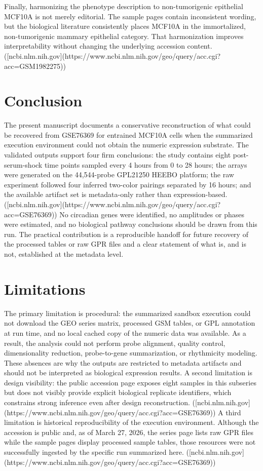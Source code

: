 \documentclass[11pt]{article}
\begin{document}
Finally, harmonizing the phenotype description to non-tumorigenic epithelial MCF10A is not merely editorial. The sample pages contain inconsistent wording, but the biological literature consistently places MCF10A in the immortalized, non-tumorigenic mammary epithelial category. That harmonization improves interpretability without changing the underlying accession content. ([ncbi.nlm.nih.gov](https://www.ncbi.nlm.nih.gov/geo/query/acc.cgi?acc=GSM1982275))

\section{Conclusion}
The present manuscript documents a conservative reconstruction of what could be recovered from GSE76369 for entrained MCF10A cells when the summarized execution environment could not obtain the numeric expression substrate. The validated outputs support four firm conclusions: the study contains eight post-serum-shock time points sampled every 4 hours from 0 to 28 hours; the arrays were generated on the 44,544-probe GPL21250 HEEBO platform; the raw experiment followed four inferred two-color pairings separated by 16 hours; and the available artifact set is metadata-only rather than expression-based. ([ncbi.nlm.nih.gov](https://www.ncbi.nlm.nih.gov/geo/query/acc.cgi?acc=GSE76369)) No circadian genes were identified, no amplitudes or phases were estimated, and no biological pathway conclusions should be drawn from this run. The practical contribution is a reproducible handoff for future recovery of the processed tables or raw GPR files and a clear statement of what is, and is not, established at the metadata level.

\section{Limitations}
The primary limitation is procedural: the summarized sandbox execution could not download the GEO series matrix, processed GSM tables, or GPL annotation at run time, and no local cached copy of the numeric data was available. As a result, the analysis could not perform probe alignment, quality control, dimensionality reduction, probe-to-gene summarization, or rhythmicity modeling. These absences are why the outputs are restricted to metadata artifacts and should not be interpreted as biological expression results. A second limitation is design visibility: the public accession page exposes eight samples in this subseries but does not visibly provide explicit biological replicate identifiers, which constrains strong inference even after design reconstruction. ([ncbi.nlm.nih.gov](https://www.ncbi.nlm.nih.gov/geo/query/acc.cgi?acc=GSE76369)) A third limitation is historical reproducibility of the execution environment. Although the accession is public and, as of March 27, 2026, the series page lists raw GPR files while the sample pages display processed sample tables, those resources were not successfully ingested by the specific run summarized here. ([ncbi.nlm.nih.gov](https://www.ncbi.nlm.nih.gov/geo/query/acc.cgi?acc=GSE76369))



\end{document}
